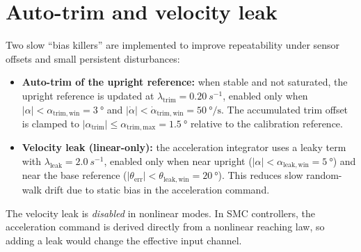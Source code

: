 \section{Auto-trim and velocity leak}
Two slow ``bias killers'' are implemented to improve repeatability under sensor offsets and small persistent disturbances:
\begin{itemize}
  \item \textbf{Auto-trim of the upright reference:} when stable and not saturated, the upright reference is updated at $\lambda_{\mathrm{trim}}=\SI{0.20}{s^{-1}}$, enabled only when $|\alpha|<\alpha_{\mathrm{trim,win}}=\SI{3}{\degree}$ and $|\dot{\alpha}|<\dot{\alpha}_{\mathrm{trim,win}}=\SI{50}{\degree\per\second}$. The accumulated trim offset is clamped to $|\alpha_{\mathrm{trim}}|\le \alpha_{\mathrm{trim,max}}=\SI{1.5}{\degree}$ relative to the calibration reference.
  \item \textbf{Velocity leak (linear-only):} the acceleration integrator uses a leaky term with $\lambda_{\mathrm{leak}}=\SI{2.0}{s^{-1}}$, enabled only when near upright ($|\alpha|<\alpha_{\mathrm{leak,win}}=\SI{5}{\degree}$) and near the base reference ($|\theta_{\mathrm{err}}|<\theta_{\mathrm{leak,win}}=\SI{20}{\degree}$). This reduces slow random-walk drift due to static bias in the acceleration command.
\end{itemize}
The velocity leak is \emph{disabled} in nonlinear modes. In SMC controllers, the acceleration command is derived directly from a nonlinear reaching law, so adding a leak would change the effective input channel.
